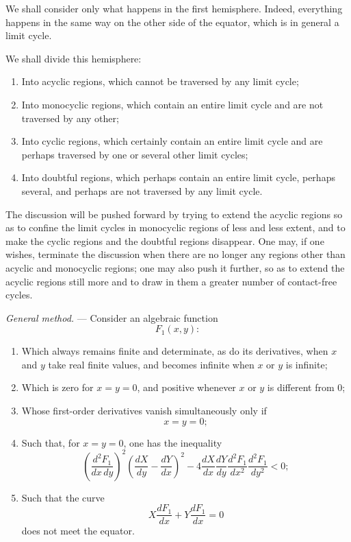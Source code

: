 \documentclass[11pt]{article}
\begin{document}
We shall consider only what happens in the first hemisphere. Indeed, everything happens in the same way on the other side of the equator, which is in general a limit cycle.

We shall divide this hemisphere:
\begin{enumerate}[label=\arabic*., leftmargin=3em]
\item Into acyclic regions, which cannot be traversed by any limit cycle;
\item Into monocyclic regions, which contain an entire limit cycle and are not traversed by any other;
\item Into cyclic regions, which certainly contain an entire limit cycle and are perhaps traversed by one or several other limit cycles;
\item Into doubtful regions, which perhaps contain an entire limit cycle, perhaps several, and perhaps are not traversed by any limit cycle.
\end{enumerate}

The discussion will be pushed forward by trying to extend the acyclic regions so as to confine the limit cycles in monocyclic regions of less and less extent, and to make the cyclic regions and the doubtful regions disappear. One may, if one wishes, terminate the discussion when there are no longer any regions other than acyclic and monocyclic regions; one may also push it further, so as to extend the acyclic regions still more and to draw in them a greater number of contact-free cycles.

\emph{General method.} --- Consider an algebraic function
\[
F_1(x,y):
\]
\begin{enumerate}[label=\arabic*., leftmargin=3em]
\item Which always remains finite and determinate, as do its derivatives, when $x$ and $y$ take real finite values, and becomes infinite when $x$ or $y$ is infinite;
\item Which is zero for $x=y=0$, and positive whenever $x$ or $y$ is different from 0;
\item Whose first-order derivatives vanish simultaneously only if
\[
x=y=0;
\]
\item Such that, for $x=y=0$, one has the inequality
\[
\left(\frac{d^2F_1}{dx\,dy}\right)^2\left(\frac{dX}{dy}-\frac{dY}{dx}\right)^2
-4\frac{dX}{dx}\frac{dY}{dy}\frac{d^2F_1}{dx^2}\frac{d^2F_1}{dy^2}<0;
\]
\item Such that the curve
\[
X\frac{dF_1}{dx}+Y\frac{dF_1}{dx}=0
\]
does not meet the equator.
\end{enumerate}
\end{document}
